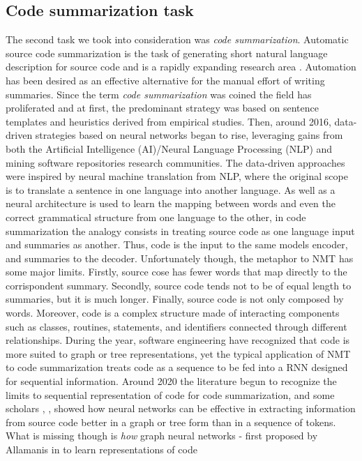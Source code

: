 \subsection{Code summarization task}
The second task we took into consideration was \textit{code summarization}. Automatic source code summarization is the task of generating short natural language description 
for source code and is a rapidly expanding research area \cite{Leclair2020}. 
Automation has been desired as an effective alternative for the manual effort of writing summaries. 
Since the term \textit{code summarization} was coined the field has proliferated and at first, the predominant strategy was based on sentence templates 
and heuristics derived from empirical studies. Then, around 2016, data-driven strategies based on neural networks began to rise, leveraging 
gains from both the Artificial Intelligence (AI)/Neural Language Processing (NLP) and mining 
software repositories research communities. 
The data-driven approaches were inspired by neural machine translation from NLP, where the original scope is to translate a sentence in 
one language into another language.
As well as a neural architecture is used to learn the mapping between words and even the correct grammatical structure from one language to the other, 
in code summarization the analogy consists in treating source code as one language input and summaries as another. Thus, code is the input to the same 
models encoder, and summaries to the decoder. 
Unfortunately though, the metaphor to NMT has some major limits. 
Firstly, source cose has fewer words that map directly to 
the corrispondent summary. Secondly, source code tends not to be of equal length to summaries, but it is much longer.
Finally, source code is not only composed by words. Moreover, code is a complex structure made of interacting components such as
classes, routines, statements, and identifiers connected through different relationships.
During the year, software engineering have recognized that code is more suited to graph or tree representations, yet the typical application of 
NMT to code summarization treats code as a sequence to be fed into a RNN designed for sequential information.
Around 2020 the literature begun to recognize the limits to sequential representation of code 
for code summarization, and some scholars \cite{hu2018deep}, \cite{leclair2019neural}, \cite{alon2018code2seq} showed how neural networks can be effective in extracting information from source code 
better in a graph or tree form than in a sequence of tokens. 
What is missing though is \textit{how} graph neural networks - first proposed by Allamanis in \cite{allamanis2018learning} to learn representations of code 
